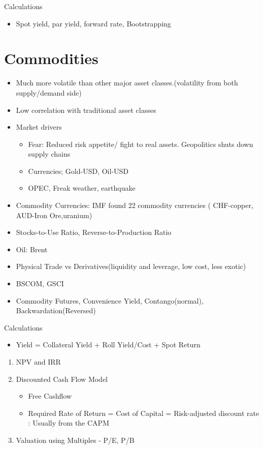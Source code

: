 \documentclass[11pt, openany]{book}              %
\begin{document}
Calculations
\begin{itemize}
    \item Spot yield, par yield, forward rate, Bootstrapping
\end{itemize}

\section{Commodities}

\begin{itemize}
    \item Much more volatile than other major asset classes.(volatility from both supply/demand side)
    \item Low correlation with traditional asset classes
    \item Market drivers
    \begin{itemize}
    	\item Fear: Reduced risk appetite/ fight to real assets. Geopolitics shuts down supply chains
    	\item Currencies; Gold-USD, Oil-USD
    	\item OPEC, Freak weather, earthquake
    \end{itemize}
    \item Commodity Currencies: IMF found 22 commodity currencies ( CHF-copper, AUD-Iron Ore,uranium)
    \item Stocks-to-Use Ratio, Reverse-to-Production Ratio
    \item Oil: Brent
    \item Physical Trade vs Derivatives(liquidity and leverage, low cost, less exotic)
    \item BSCOM, GSCI 
    \item Commodity Futures, Convenience Yield, Contango(normal), Backwardation(Reversed)
\end{itemize}

Calculations
\begin{itemize}
    \item Yield = Collateral Yield + Roll Yield/Cost + Spot Return
\end{itemize}

\begin{enumerate}
 \item NPV and IRR 
 \item Discounted Cash Flow Model
  \begin{itemize}
    \item Free Cashflow
    \item Required Rate of Return = Cost of Capital = Risk-adjusted discount rate : Usually from the CAPM
   \end{itemize}
 \item Valuation using Multiples - P/E, P/B 
 \end{enumerate}
\end{document}
